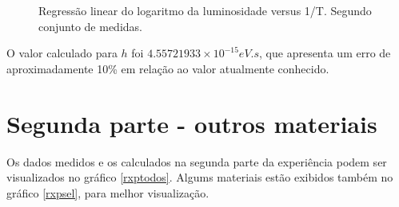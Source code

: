 \documentclass[brazilian,12pt,a4paper,final]{article}
\begin{document}
\begin{figure}[htbp!]
  \caption{Regressão linear do logaritmo da luminosidade versus 1/T. Segundo conjunto de medidas.}
  \label{fighhh}
  \centering
\end{figure}

O valor calculado para $h$ foi $4.55721933 \times 10^{-15} eV.s$, que apresenta
um erro de aproximadamente 10\% em relação ao valor atualmente conhecido.

\section{Segunda parte - outros materiais}

Os dados medidos e os calculados na segunda parte da experiência podem ser
visualizados no gráfico \ref{rxptodos}. Algums materiais estão exibidos também
no gráfico \ref{rxpsel}, para melhor visualização.
\end{document}
